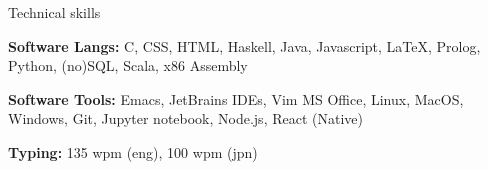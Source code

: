 \documentclass[10pt]{resume} %
\begin{document}
\begin{rSection}{Technical skills}
    \item \textbf{Software Langs:}
        C,
        CSS,
        HTML,
        Haskell,
        Java,
        Javascript,
        \LaTeX,
        Prolog,
        Python,
        (no)SQL,
        Scala,
        x86 Assembly
    \item \textbf{Software Tools:}
        Emacs,
        JetBrains IDEs,
        Vim
        MS Office,
        Linux,
        MacOS,
        Windows,
        Git,
        Jupyter notebook,
        Node.js,
        React (Native)
    \item \textbf{Typing:} 135 wpm (eng), 100 wpm (jpn)
\end{rSection}

\end{document}
